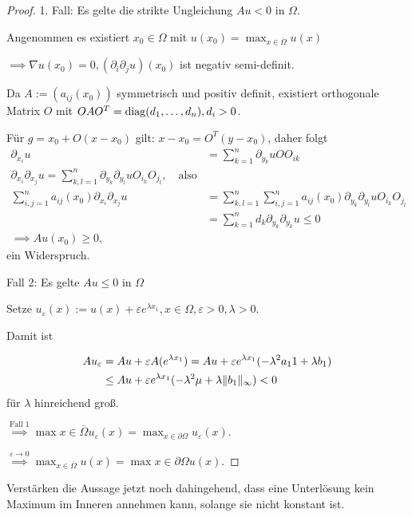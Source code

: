 \begin{proof}
  1. Fall: Es gelte die strikte Ungleichung $Au < 0$ in $\Omega$.

  Angenommen es existiert $x_0 \in \Omega$ mit $u(x_0) = \max_{x \in \overline\Omega} u(x)$

  $\implies \nabla u(x_0) = 0, (\partial_i \partial_j u)(x_0)$ ist negativ semi-definit.

  Da $A:=(a_{ij}(x_0))$ symmetrisch und positiv definit, existiert orthogonale Matrix $O$ mit $OAO^T = \operatorname{diag}(d_1,\dots,d_n), d_i > 0$.

  Für $g = x_0 + O(x - x_0)$ gilt: $x - x_0 = O^T(y - x_0)$, daher folgt
  \begin{align*}
    \partial_{x_i} u &= \sum_{k = 1}^n \partial_{y_k} uO O_{ik} \\
    \partial_{x_i} \partial_{x_j} u = \sum_{k,l = 1}^n \partial_{y_k}\partial_{y_l} u O_{i_k} O_{j_l}, \quad\text{also}\\
    \sum_{i,j=1}^n a_{ij}(x_0) \partial_{x_i} \partial_{x_j} u &= \sum_{k,l = 1}^n \sum_{i,j = 1}^n a_{ij}(x_0) \partial_{y_k} \partial_{y_l} u O_{i_k} O_{j_l} \\
    &= \sum_{k = 1}^n d_k \partial_{y_k} \partial_{y_k} u \leq 0 \\
    \implies Au(x_0) \geq 0,
  \end{align*}
  ein Widerspruch.

  Fall 2: Es gelte $A u \leq 0$ in $\Omega$

  Setze $u_\varepsilon(x) := u(x) + \varepsilon e^{\lambda x_1}, x \in \Omega, \varepsilon > 0, \lambda > 0.$

  Damit ist 
  
  \begin{align*}
  A u_\varepsilon &= Au + \varepsilon A(e^{\lambda x_1}) = A u + \varepsilon e^{\lambda x_1} (-\lambda^2 a_11 + \lambda b_1) \\
  &\leq Au + \varepsilon e^{\lambda x_1} (-\lambda^2 \mu + \lambda \lVert b_1 \rVert_\infty ) < 0
  \end{align*}
  für $\lambda$ hinreichend groß.

  $\overset{\text{Fall 1}}{\implies} \max{x \in \overline\Omega} u_\varepsilon(x)  = \max_{x \in \partial\Omega} u_\varepsilon(x)$.

  $\overset{\varepsilon \to 0}{\implies} \max_{x \in \overline\Omega} u(x) = \max{x \in \partial\Omega} u(x)$.
\end{proof}

Verstärken die Aussage jetzt noch dahingehend, dass eine Unterlösung kein Maximum im Inneren annehmen kann, solange sie nicht konstant ist.

